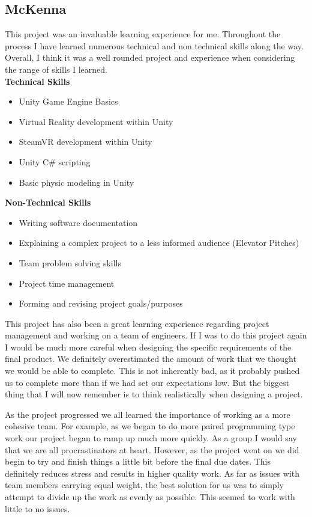 \documentclass[10pt,journal,compsoc,onecolumn, draftclsnofoot]{IEEEtran}
\begin{document}
\subsection{McKenna}
This project was an invaluable learning experience for me. Throughout the process I have learned numerous technical and non technical skills along the way. Overall, I think it was a well rounded project and experience when considering the range of skills I learned. \\

\textbf{Technical Skills}
\begin{itemize}
	\item Unity Game Engine Basics
	\item Virtual Reality development within Unity
	\item SteamVR development within Unity
	\item Unity C\# scripting
	\item Basic physic modeling in Unity
\end{itemize}

\textbf{Non-Technical Skills}
\begin{itemize}
	\item Writing software documentation
	\item Explaining a complex project to a less informed audience (Elevator Pitches)
	\item Team problem solving skills
	\item Project time management
	\item Forming and revising project goals/purposes \\
\end{itemize}

This project has also been a great learning experience regarding project management and working on a team of engineers. If I was to do this project again I would be much more careful when designing the specific requirements of the final product. We definitely overestimated the amount of work that we thought we would be able to complete. This is not inherently bad, as it probably pushed us to complete more than if we had set our expectations low. But the biggest thing that I will now remember is to think realistically when designing a project.

As the project progressed we all learned the importance of working as a more cohesive team. For example, as we began to do more paired programming type work our project began to ramp up much more quickly. As a group I would say that we are all procrastinators at heart. However, as the project went on we did begin to try and finish things a little bit before the final due dates. This definitely reduces stress and results in higher quality work. As far as issues with team members carrying equal weight, the best solution for us was to simply attempt to divide up the work as evenly as possible. This seemed to work with little to no issues.
\end{document}
